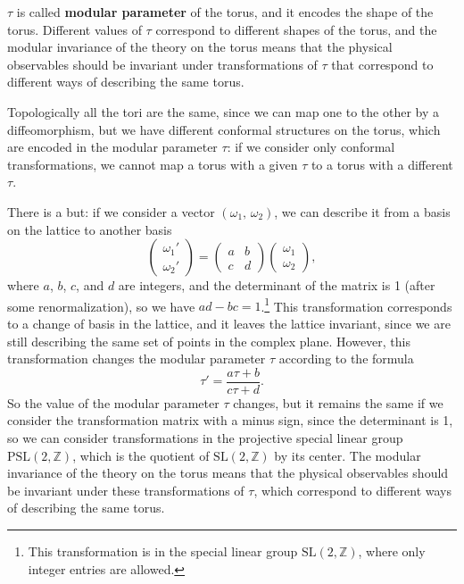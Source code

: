 \(\tau\) is called \textbf{modular parameter} of the torus, and it encodes the shape of the torus. Different values of \(\tau\) correspond to different shapes of the torus, and the modular invariance of the theory on the torus means that the physical observables should be invariant under transformations of \(\tau\) that correspond to different ways of describing the same torus.

Topologically all the tori are the same, since we can map one to the other by a diffeomorphism, but we have different conformal structures on the torus, which are encoded in the modular parameter \(\tau\): if we consider only conformal transformations, we cannot map a torus with a given \(\tau\) to a torus with a different \(\tau\).

There is a but: if we consider a vector \((\omega_1,\, \omega_2)\), we can describe it from a basis on the lattice to another basis
\[
    \begin{pmatrix}
        \omega_1' \\
        \omega_2'
    \end{pmatrix} = \begin{pmatrix}
        a & b \\
        c & d
    \end{pmatrix} \begin{pmatrix}
        \omega_1 \\
        \omega_2
    \end{pmatrix},
\]
where \(a\), \(b\), \(c\), and \(d\) are integers, and the determinant of the matrix is 1 (after some renormalization), so we have \(ad - bc = 1\).\footnote{This transformation is in the special linear group \(\mathrm{SL}(2, \mathbb{Z})\), where only integer entries are allowed.} This transformation corresponds to a change of basis in the lattice, and it leaves the lattice invariant, since we are still describing the same set of points in the complex plane. However, this transformation changes the modular parameter \(\tau\) according to the formula
\[
    \tau' = \frac{a\tau + b}{c\tau + d}.
\]
So the value of the modular parameter \(\tau\) changes, but it remains the same if we consider the transformation matrix with a minus sign, since the determinant is 1, so we can consider transformations in the projective special linear group \(\mathrm{PSL}(2, \mathbb{Z})\), which is the quotient of \(\mathrm{SL}(2, \mathbb{Z})\) by its center. The modular invariance of the theory on the torus means that the physical observables should be invariant under these transformations of \(\tau\), which correspond to different ways of describing the same torus.

